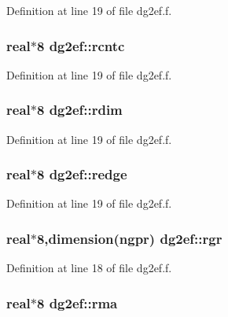 Definition at line 19 of file dg2ef.f.\hypertarget{namespacedg2ef_e49c875203b2860bc38a709d3bf237c3}{
\subsubsection[rcntc]{\setlength{\rightskip}{0pt plus 5cm}real$\ast$8 {\bf dg2ef::rcntc}}}
\label{namespacedg2ef_e49c875203b2860bc38a709d3bf237c3}




Definition at line 19 of file dg2ef.f.\hypertarget{namespacedg2ef_8c12d4a3bc4da3c8ad30e8ca3d291645}{
\subsubsection[rdim]{\setlength{\rightskip}{0pt plus 5cm}real$\ast$8 {\bf dg2ef::rdim}}}
\label{namespacedg2ef_8c12d4a3bc4da3c8ad30e8ca3d291645}




Definition at line 19 of file dg2ef.f.\hypertarget{namespacedg2ef_dfe0578ee984fb3f84caf5b872f07942}{
\subsubsection[redge]{\setlength{\rightskip}{0pt plus 5cm}real$\ast$8 {\bf dg2ef::redge}}}
\label{namespacedg2ef_dfe0578ee984fb3f84caf5b872f07942}




Definition at line 19 of file dg2ef.f.\hypertarget{namespacedg2ef_23ecb247101b37839cf1b4fa2cf347ac}{
\subsubsection[rgr]{\setlength{\rightskip}{0pt plus 5cm}real$\ast$8,dimension(ngpr) {\bf dg2ef::rgr}}}
\label{namespacedg2ef_23ecb247101b37839cf1b4fa2cf347ac}




Definition at line 18 of file dg2ef.f.\hypertarget{namespacedg2ef_945f4fbe9751fc4227640df49fdecb6e}{
\subsubsection[rma]{\setlength{\rightskip}{0pt plus 5cm}real$\ast$8 {\bf dg2ef::rma}}}
\label{namespacedg2ef_945f4fbe9751fc4227640df49fdecb6e}




